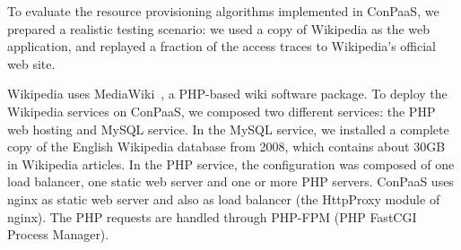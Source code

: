 
To evaluate the resource provisioning algorithms implemented in ConPaaS,
we prepared a realistic testing scenario: we used a copy of Wikipedia as
the web application, and replayed a fraction of the access traces to
Wikipedia's official web site.  

Wikipedia uses MediaWiki~\cite{mediawiki}, a PHP-based wiki software 
package.
To deploy the Wikipedia services on ConPaaS, we composed two different services: the PHP web hosting and MySQL service. In the MySQL service, we installed a complete copy of the English Wikipedia database from 2008, which contains about 30GB in Wikipedia articles.
In the PHP service, the configuration was composed of one load balancer,
one static web server and one or more PHP servers. ConPaaS uses nginx
as static web server and also as load balancer (the HttpProxy module
of nginx). The PHP requests are handled through PHP-FPM (PHP FastCGI
Process Manager).




